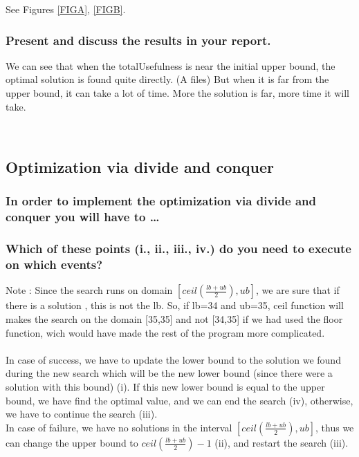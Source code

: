 \documentclass[a4paper ,12pt,french]{article}
\begin{document}
See Figures \ref{FIGA}, \ref{FIGB}.
\subsubsection{Present and discuss the results in your report.}

We can see that when the totalUsefulness is near the initial upper bound, the optimal solution is found quite directly. (A files)
But when it is far from the upper bound, it can take a lot of time. More the solution is far, more time it will take.

\newpage
\
\newpage

\subsection{Optimization via divide and conquer}

\subsubsection{In order to implement the optimization via divide and conquer you will have to \dots}

\subsubsection{Which of these points (i., ii., iii., iv.) do you need to execute on which events?}
Note : Since the search runs on domain $[ceil(\frac{lb + ub}{2}),ub]$, we are sure that if there is a solution , this is not the lb. So, if lb=34 and ub=35, ceil function will makes the search on the domain [35,35] and not [34,35] if we had used the floor function, wich would have made the rest of the program more complicated.\\\\

In case of success, we have to update the lower bound to the solution we found during the new search which will be the new lower bound (since there were a solution with this bound) (i). If this new lower bound is equal to the upper bound, we have find the optimal value, and we can end the search (iv), otherwise, we have to continue the search (iii).\\

In case of failure, we have no solutions in the interval $[ceil(\frac{lb + ub}{2}),ub]$, thus we can change the upper bound to $ceil(\frac{lb + ub}{2})-1$ (ii), and restart the search (iii).\\
\end{document}
